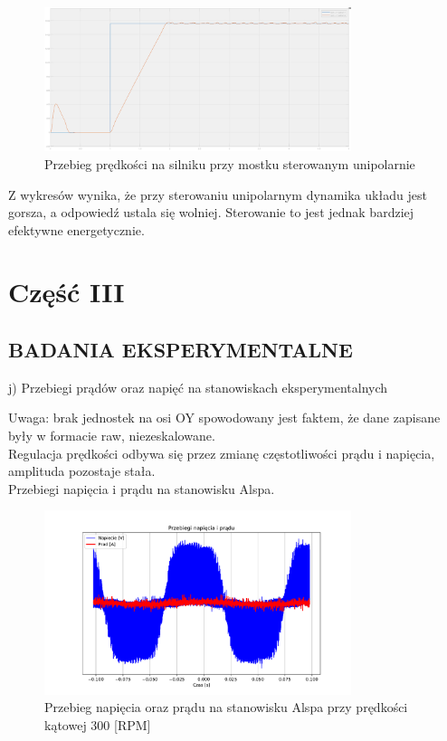 \documentclass[11pt]{article}
\begin{document}
\begin{figure}[H]
\centering
\includegraphics[width=0.8\textwidth]{aun1_unipolar_bridge.png}
\caption{Przebieg prędkości na silniku przy mostku sterowanym unipolarnie}
\end{figure}

Z wykresów wynika, że przy sterowaniu unipolarnym dynamika układu jest gorsza, a odpowiedź ustala się wolniej. Sterowanie to jest jednak bardziej efektywne energetycznie.\\

\section{Część III}

\subsection{BADANIA EKSPERYMENTALNE}

j) Przebiegi prądów oraz napięć na stanowiskach eksperymentalnych

Uwaga: brak jednostek na osi OY spowodowany jest faktem, że dane
zapisane były w formacie raw, niezeskalowane.\\

Regulacja prędkości odbywa się przez zmianę częstotliwości prądu i napięcia, amplituda pozostaje stała.\\

Przebiegi napięcia i prądu na stanowisku Alspa.\\

\begin{figure}[H]
\centering
\includegraphics[width=0.8\textwidth]{aun1_alspa_rpm300.pdf}
\caption{Przebieg napięcia oraz prądu na stanowisku Alspa przy prędkości kątowej 300 [RPM]}
\end{figure}
\end{document}
